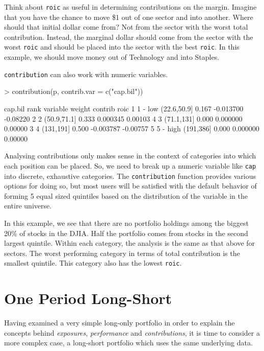 \documentclass[a4paper]{report}
\begin{document}
\begin{article}
Think about \texttt{roic} as useful in determining contributions on
the margin. Imagine that you have the chance to move \$1 out of one
sector and into another. Where should that initial dollar come from?
Not from the sector with the worst total contribution. Instead, the
marginal dollar should come from the sector with the worst
\texttt{roic} and should be placed into the sector with the best
\texttt{roic}. In this example, we should move money out of Technology
and into Staples.

\texttt{contribution} can also work with numeric variables.

\begin{Schunk}
\begin{Sinput}
> contribution(p, contrib.var = c("cap.bil"))
\end{Sinput}
\begin{Soutput}
cap.bil 
      rank    variable weight   contrib     roic
1  1 - low (22.6,50.9]  0.167 -0.013700 -0.08220
2        2 (50.9,71.1]  0.333  0.000345  0.00103
4        3  (71.1,131]  0.000  0.000000  0.00000
3        4   (131,191]  0.500 -0.003787 -0.00757
5 5 - high   (191,386]  0.000  0.000000  0.00000
\end{Soutput}
\end{Schunk}

Analysing contributions only makes sense in the context of categories
into which each position can be placed. So, we need to break up a
numeric variable like \texttt{cap} into discrete, exhaustive
categories. The \texttt{contribution} function provides various
options for doing so, but most users will be satisfied with the
default behavior of forming 5 equal sized quintiles based on the
distribution of the variable in the entire universe.

In this example, we see that there are no portfolio holdings among the
biggest 20\% of stocks in the DJIA. Half the portfolio comes from
stocks in the second largest quintile. Within each category, the
analysis is the same as that above for sectors. The worst performing
category in terms of total contribution is the smallest quintile.
This category also has the lowest \texttt{roic}.



\section*{One Period Long-Short}

Having examined a very simple long-only portfolio in order to explain
the concepts behind \emph{exposures}, \emph{performance} and
\emph{contributions}, it is time to consider a more complex case, a
long-short portfolio which uses the same underlying data.



\end{article}
\end{document}
